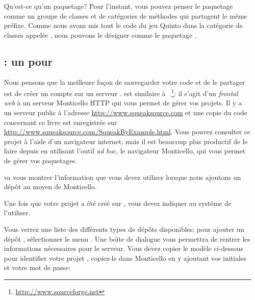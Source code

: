 \documentclass[a4paper,10pt,twoside]{book}
\begin{document}
Qu'est-ce qu'un paquetage? Pour l'instant, vous pouvez penser le paquetage comme un groupe de classes et de catégories de méthodes qui partagent le m\^eme préfixe. Comme nous avons mis tout le code du jeu Quinto dans la catégorie de classes appelée , nous pouvons le désigner comme le paquetage .


\subsection{\ind{\squeaksource}: un  pour \sq} 
Nous pensons que la meilleure façon de sauvegarder votre code et de le
partager est de créer un compte sur un serveur
\squeaksource. \squeaksource est similaire à
\sourceforge~\footnote{\url{http://www.sourceforge.net}}: il s'agit d'un
\emph{frontal web} à un serveur Monticello HTTP qui vous permet de gérer vos projets.
Il y a un serveur public \squeaksource à l'adresse
\url{http://www.squeaksource.com} et une copie du code concernant ce
livre est enregistrée sur
\url{http://www.squeaksource.com/SqueakByExample.html}. Vous pouvez
consulter ce projet à l'aide d'un navigateur internet, mais il est
beaucoup plus productif de le faire depuis \sq en utilisant
l'outil \emph{ad hoc}, le navigateur Monticello, qui vous permet de
gérer vos paquetages.

\squeaksource va vous montrer l'information que vous devez utiliser
lorsque nous ajoutons un dépôt au moyen de Monticello.

Une fois que votre projet a été créé sur \squeaksource, vous devez indiquer au système \sq de l'utiliser.

  Vous
verrez une liste des différents types de dépôts disponibles; pour
ajouter un dépôt \squeaksource, sélectionner le menu . Une
bo\^{\i}te de dialogue vous permettra de rentrer les informations
nécessaires pour le serveur.
Vous devez copier le modèle ci-dessous pour identifier votre projet
\squeaksource, copiez-le dans Monticello en y ajoutant vos initiales
et votre mot de passe:
\end{document}
